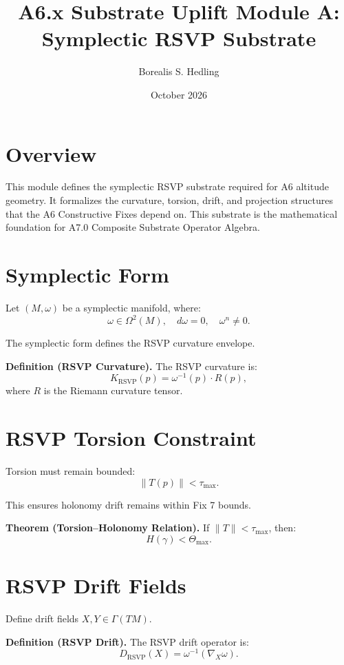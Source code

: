 \documentclass[11pt]{article}
\title{A6.x Substrate Uplift Module A: Symplectic RSVP Substrate}
\author{Borealis S. Hedling}
\date{October 2026}
\begin{document}
\maketitle

\section*{Overview}

This module defines the symplectic RSVP substrate required for A6 altitude
geometry. It formalizes the curvature, torsion, drift, and projection
structures that the A6 Constructive Fixes depend on. This substrate is the
mathematical foundation for A7.0 Composite Substrate Operator Algebra.

\section{Symplectic Form}

Let $(M,\omega)$ be a symplectic manifold, where:
\[
\omega \in \Omega^2(M), \quad d\omega = 0, \quad \omega^n \neq 0.
\]

The symplectic form defines the RSVP curvature envelope.

\textbf{Definition (RSVP Curvature).}
The RSVP curvature is:
\[
K_{\mathrm{RSVP}}(p) = \omega^{-1}(p) \cdot R(p),
\]
where $R$ is the Riemann curvature tensor.

\section{RSVP Torsion Constraint}

Torsion must remain bounded:
\[
\|T(p)\| < \tau_{\max}.
\]

This ensures holonomy drift remains within Fix 7 bounds.

\textbf{Theorem (Torsion–Holonomy Relation).}
If $\|T\| < \tau_{\max}$, then:
\[
H(\gamma) < \Theta_{\max}.
\]

\section{RSVP Drift Fields}

Define drift fields $X,Y \in \Gamma(TM)$.

\textbf{Definition (RSVP Drift).}
The RSVP drift operator is:
\[
D_{\mathrm{RSVP}}(X) = \omega^{-1}(\nabla_X \omega).
\]
\end{document}
